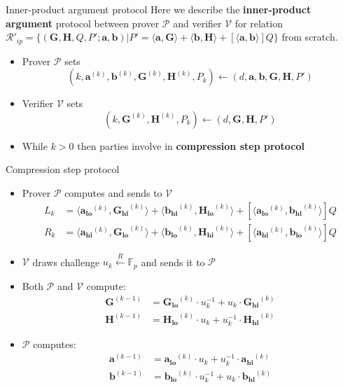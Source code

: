 \documentclass{zkdl-presentation-template}
\begin{document}
\begin{frame}{Inner-product argument protocol}
    Here we describe the \textbf{inner-product argument} protocol between prover $\mathcal{P}$ and verifier $\mathcal{V}$ for relation $\mathcal{R}'_{ip} = \{ (\mathbf{G,H}, Q, P'; \mathbf{a,b}) \vert P' = \langle \mathbf{a,G} \rangle + \langle \mathbf{b,H} \rangle + [\langle \mathbf{a,b} \rangle]Q \}$ from scratch.
    \begin{itemize}
        \item Prover $\mathcal{P}$ sets $$(k, \mathbf{a}^{(k)}, \mathbf{b}^{(k)}, \mathbf{G}^{(k)}, \mathbf{H}^{(k)}, P_k) \gets (d, \mathbf{a,b,G,H},P')$$
        \item Verifier $\mathcal{V}$ sets $$(k, \mathbf{G}^{(k)}, \mathbf{H}^{(k)}, P_k) \gets (d, \mathbf{G,H},P')$$
        \item While $k > 0$ then parties involve in \textbf{compression step protocol}
    \end{itemize}
\end{frame}

\begin{frame}{Compression step protocol}
    \begin{itemize}
        \item Prover $\mathcal{P}$ computes and sends to $\mathcal{V}$
            \begin{align*}
                L_{k} &= \langle \mathbf{a_{lo}}^{(k)}, \mathbf{G_{hi}}^{(k)}\rangle + \langle \mathbf{b_{hi}}^{(k)}, \mathbf{H_{lo}}^{(k)}\rangle + [\langle \mathbf{a_{lo}}^{(k)}, \mathbf{b_{hi}}^{(k)}\rangle]Q \\
                R_{k} &= \langle \mathbf{a_{hi}}^{(k)}, \mathbf{G_{lo}}^{(k)}\rangle + \langle \mathbf{b_{lo}}^{(k)}, \mathbf{H_{hi}}^{(k)}\rangle + [\langle \mathbf{a_{hi}}^{(k)}, \mathbf{b_{lo}}^{(k)}\rangle]Q
            \end{align*}
        \item $\mathcal{V}$ draws challenge $u_k \xleftarrow{R} \mathbb{F}_p$ and sends it to $\mathcal{P}$
        \item Both $\mathcal{P}$ and $\mathcal{V}$ compute:
            \begin{align*}
                \mathbf{G}^{(k-1)} &= \mathbf{G_{lo}}^{(k)} \cdot u_k^{-1} + u_k \cdot \mathbf{G_{hi}}^{(k)} \\
                \mathbf{H}^{(k-1)} &= \mathbf{H_{lo}}^{(k)} \cdot u_k + u_k^{-1} \cdot \mathbf{H_{hi}}^{(k)}
            \end{align*}
        \item $\mathcal{P}$ computes:
            \begin{align*}
                \mathbf{a}^{(k-1)} &= \mathbf{a_{lo}}^{(k)} \cdot u_k + u_k^{-1} \cdot \mathbf{a_{hi}}^{(k)} \\
                \mathbf{b}^{(k-1)} &= \mathbf{b_{lo}}^{(k)} \cdot u_k^{-1} + u_k \cdot \mathbf{b_{hi}}^{(k)} \\
            \end{align*}
    \end{itemize}
\end{frame}
\end{document}
